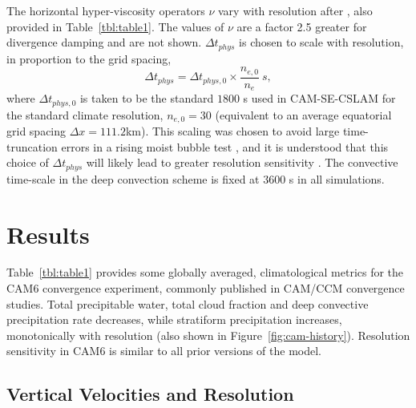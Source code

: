 \documentclass[times]{qjrms4}
\begin{document}
The horizontal hyper-viscosity operators $\nu$ vary with resolution after \cite{HETAL2019JAMES}, also provided in Table~\ref{tbl:table1}. The values of $\nu$ are a factor 2.5 greater for divergence damping and are not shown. $\Delta t_{phys}$ is chosen to scale with resolution, in proportion to the grid spacing,
\begin{equation}
\Delta t_{phys} = \Delta t_{phys,0} \times \frac{n_{e,0}}{n_e}~s,\label{eq:dt-scale}
\end{equation}
where $\Delta t_{phys,0}$ is taken to be the standard $1800$ s used in CAM-SE-CSLAM for the standard climate resolution, $n_{e,0} = 30$ (equivalent to an average equatorial grid spacing $\Delta x = 111.2$km). This scaling was chosen to avoid large time-truncation errors in a rising moist bubble test \citep[Appendix A in][]{HETAL2019JAMES}, and it is understood that this choice of $\Delta t_{phys}$ will likely lead to greater resolution sensitivity \citep{W2008TELLUS}. The convective time-scale in the deep convection scheme is fixed at 3600 s in all simulations.
 
 \section{Results}

Table~\ref{tbl:table1} provides some globally averaged, climatological metrics for the CAM6 convergence experiment, commonly published in CAM/CCM convergence studies. Total precipitable water, total cloud fraction and deep convective precipitation rate decreases, while stratiform precipitation increases, monotonically with resolution (also shown in Figure~\ref{fig:cam-history}). Resolution sensitivity in CAM6 is similar to all prior versions of the model. 

\subsection{Vertical Velocities and Resolution}
\end{document}
